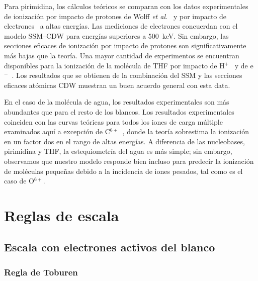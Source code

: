 Para pirimidina, los cálculos teóricos se comparan con los datos 
experimentales de ionización por impacto de protones de Wolff 
\textit{et al.}~\cite{wolff2014} y por impacto de 
electrones~\cite{bug2017} a altas energías. Las mediciones de electrones 
concuerdan con el modelo SSM--CDW para energías superiores a 500~keV. 
Sin embargo, las secciones eficaces de ionización por impacto de 
protones son significativamente más bajas que la teoría. Una mayor 
cantidad de experimentos se encuentran disponibles para la ionización de 
la molécula de THF por impacto de H$^+$~\cite{wang2016} y de 
e$^-$~\cite{bug2017,wolf2019,fuss2009}. Los resultados que se obtienen 
de la combinación del SSM y las secciones eficaces atómicas CDW muestran 
un buen acuerdo general con esta data.

En el caso de la molécula de agua, los resultados experimentales son más 
abundantes que para el resto de los blancos. Los resultados 
experimentales~\cite{Luna2007,Bolorizadeh86,H_Rudd85,Ohsawa05,He_Rudd85,
toburen80,Bhattacharjee:16} coinciden con las curvas teóricas para 
todos los iones de carga múltiple examinados aquí a excepción de
C$^{6+}$~\cite{DalCappello:09,Bhattacharjee:17}, donde la teoría 
sobrestima la ionización en un factor dos en el rango de altas energías. 
A diferencia de las nucleobases, pirimidina y THF, la estequiometría del 
agua es más simple; sin embargo, observamos que nuestro modelo responde 
bien incluso para predecir la ionización de moléculas pequeñas debido a 
la incidencia de iones pesados, tal como es el caso de O$^{6+}$.

\section{Reglas de escala}
\label{sec:scaling}

\subsection{Escala con electrones activos del blanco}
\label{subsec:ne_scaling}

\subsubsection{Regla de Toburen}
\label{subsec:toburen}

